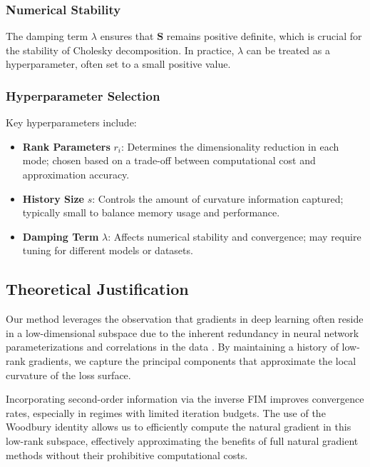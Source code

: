 \subsubsection{Numerical Stability}

The damping term $\lambda$ ensures that $\mathbf{S}$ remains positive definite, which is crucial for the stability of Cholesky decomposition. In practice, $\lambda$ can be treated as a hyperparameter, often set to a small positive value.

\subsubsection{Hyperparameter Selection}

Key hyperparameters include:

\begin{itemize}
    \item \textbf{Rank Parameters} $r_i$: Determines the dimensionality reduction in each mode; chosen based on a trade-off between computational cost and approximation accuracy.
    \item \textbf{History Size} $s$: Controls the amount of curvature information captured; typically small to balance memory usage and performance.
    \item \textbf{Damping Term} $\lambda$: Affects numerical stability and convergence; may require tuning for different models or datasets.
\end{itemize}

\subsection{Theoretical Justification}

Our method leverages the observation that gradients in deep learning often reside in a low-dimensional subspace due to the inherent redundancy in neural network parameterizations and correlations in the data \citep{gurariReducingTrainingTime2021}. By maintaining a history of low-rank gradients, we capture the principal components that approximate the local curvature of the loss surface.

Incorporating second-order information via the inverse FIM improves convergence rates, especially in regimes with limited iteration budgets. The use of the Woodbury identity allows us to efficiently compute the natural gradient in this low-rank subspace, effectively approximating the benefits of full natural gradient methods without their prohibitive computational costs.

